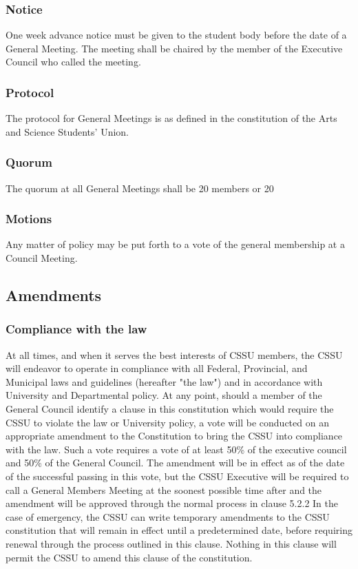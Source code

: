 \documentclass{article}
\begin{document}
\subsubsection{Notice}  \label{sec:5.1.1}
One week advance notice must be given to the student body before the date of a General Meeting. The meeting shall be chaired by the member of the Executive Council who called the meeting.
\subsubsection{Protocol}  \label{sec:5.1.2}
The protocol for General Meetings is as defined in the constitution of the Arts and Science Students’ Union.
\subsubsection{Quorum}  \label{sec:5.1.3}
The quorum at all General Meetings shall be 20 members or 20%
\subsubsection{Motions}  \label{sec:5.1.4}
Any matter of policy may be put forth to a vote of the general membership at a Council Meeting.
\subsection{Amendments} \label{sec:5.2}
\subsubsection{Compliance with the law}  \label{sec:5.2.1}
At all times, and when it serves the best interests of CSSU members, the CSSU will endeavor to
operate in compliance with all Federal, Provincial, and Municipal laws and guidelines (hereafter "the law") and in accordance with University and Departmental policy.
At any point, should a member of the General Council identify a clause in this constitution which would require the CSSU to violate the law or University policy, a vote will be conducted on an appropriate amendment to the Constitution to bring the CSSU into compliance with the law. Such a vote requires a vote of at least 50\% of the executive council and 50\% of the General Council. The amendment will be in effect as of the date of the successful passing in this vote, but the CSSU Executive will be required to call a General Members Meeting at the soonest possible time after and the amendment will be approved through the normal process in clause 5.2.2
In the case of emergency, the CSSU can write temporary amendments to the CSSU constitution that will remain in effect until a predetermined date, before requiring renewal through the process outlined in this clause.
Nothing in this clause will permit the CSSU to amend this clause of the constitution.
\end{document}

